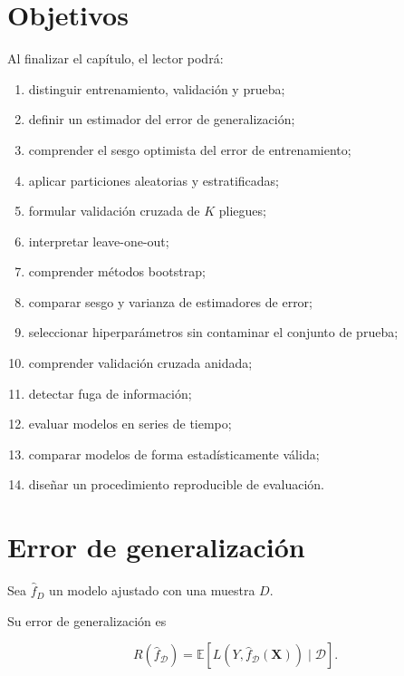 \documentclass[
  spanish,
  10.5pt,
  letterpaper,
  DIV=11,
  numbers=noendperiod,
  oneside,
  open=any]{scrreprt}
\providecommand{\tightlist}{%
  \setlength{\itemsep}{0pt}\setlength{\parskip}{0pt}}
\theoremstyle{definition}
\theoremstyle{definition}
\theoremstyle{plain}
\theoremstyle{remark}
\begin{document}
\section*{Objetivos}\label{objetivos-6}


Al finalizar el capítulo, el lector podrá:

\begin{enumerate}
\def\labelenumi{\arabic{enumi}.}
\tightlist
\item
  distinguir entrenamiento, validación y prueba;
\item
  definir un estimador del error de generalización;
\item
  comprender el sesgo optimista del error de entrenamiento;
\item
  aplicar particiones aleatorias y estratificadas;
\item
  formular validación cruzada de \(K\) pliegues;
\item
  interpretar leave-one-out;
\item
  comprender métodos bootstrap;
\item
  comparar sesgo y varianza de estimadores de error;
\item
  seleccionar hiperparámetros sin contaminar el conjunto de prueba;
\item
  comprender validación cruzada anidada;
\item
  detectar fuga de información;
\item
  evaluar modelos en series de tiempo;
\item
  comparar modelos de forma estadísticamente válida;
\item
  diseñar un procedimiento reproducible de evaluación.
\end{enumerate}

\section*{Error de generalización}\label{error-de-generalizaciuxf3n}


Sea \(\widehat{f}_{D}\) un modelo ajustado con una muestra \(D\).

Su error de generalización es

\[
R(\widehat{f}_{\mathcal{D}})
=
\mathbb{E}
\left[
L
\left(
Y,
\widehat{f}_{\mathcal{D}}(\mathbf{X})
\right)
\mid
\mathcal{D}
\right].
\]
\end{document}
